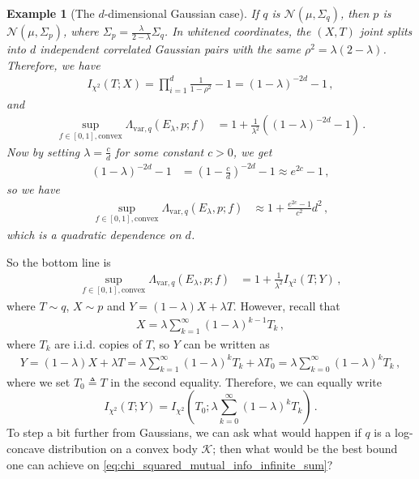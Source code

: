 \documentclass{article}
\theoremstyle{plain}
\theoremstyle{definition}
\theoremstyle{plain}
\newtheorem{exampleinner}[theorem]{Example}
\newenvironment{example}[1][]{%
    \begin{mdframed}[style=examplestyle]%
    \begin{exampleinner}[#1]%
}{%
    \end{exampleinner}%
    \end{mdframed}%
}
\newcommand{\cN}{\mathcal N}
\newcommand{\cK}{\mathcal K}
\begin{document}
\begin{example}[The $d$-dimensional Gaussian case]
    If $q$ is $\cN(\mu, \Sigma_q)$, then $p$ is $\cN(\mu, \Sigma_p)$,
    where $\Sigma_p = \frac{\lambda}{2-\lambda} \Sigma_q$.
    In whitened coordinates, the $(X, T)$ joint splits into $d$ independent
    correlated Gaussian pairs with the same $\rho^2 = \lambda(2-\lambda)$.
    Therefore, we have
    \begin{align}
        I_{\chi^2}(T;X) = \prod_{i=1}^d \frac{1}{1-\rho^2} - 1 = (1-\lambda)^{-2d} - 1\,,
    \end{align}
    and
    \begin{align}
        \sup_{f \in [0,1], \textrm{convex}}\Lambda_{\text{var}, q}(E_\lambda, p; f)
         & = 1 + \frac{1}{\lambda^2} \left(
        (1 - \lambda)^{-2d} - 1
        \right)\,.
    \end{align}
    Now by setting $\lambda = \frac{c}{d}$ for some constant $c>0$, we get
    \begin{align}
        (1 - \lambda)^{-2d} - 1
         & = \left(1 - \frac{c}{d}\right)^{-2d} - 1
        \approx e^{2c} - 1\,,
    \end{align}
    so we have
    \begin{align}
        \sup_{f \in [0,1], \textrm{convex}}\Lambda_{\text{var}, q}(E_\lambda, p; f)
         & \approx 1 + \frac{e^{2c} - 1}{c^2} d^2\,,
    \end{align}
    which is a quadratic dependence on $d$.
\end{example}

So the bottom line is
\begin{align}
    \sup_{f \in [0,1], \textrm{convex}}\Lambda_{\text{var}, q}(E_\lambda, p; f)
     & = 1 + \frac{1}{\lambda^2} I_{\chi^2}(T;Y)\,,
\end{align}
where $T\sim q$, $X\sim p$ and $Y = (1-\lambda) X + \lambda T$.
However, recall that
\begin{align}
    X = \lambda \sum_{k=1}^\infty (1-\lambda)^{k-1} T_k\,,
\end{align}
where $T_k$ are i.i.d. copies of $T$, so $Y$ can be written as
\begin{align}
    Y = (1-\lambda) X + \lambda T = \lambda \sum_{k=1}^\infty (1-\lambda)^{k} T_k + \lambda T_0
    = \lambda \sum_{k=0}^\infty (1-\lambda)^k T_k\,,
\end{align}
where we set $T_0 \triangleq T$ in the second equality.
Therefore, we can equally write
\begin{equation}
    I_{\chi^2}(T;Y) = I_{\chi^2}\left(T_0; \lambda \sum_{k=0}^\infty (1-\lambda)^k T_k\right)\,.
    \label{eq:chi_squared_mutual_info_infinite_sum}
\end{equation}
To step a bit further from Gaussians, we can ask what would happen if $q$ is a log-concave distribution
on a convex body $\cK$; then what would be the best bound one can achieve on \eqref{eq:chi_squared_mutual_info_infinite_sum}?
\end{document}

